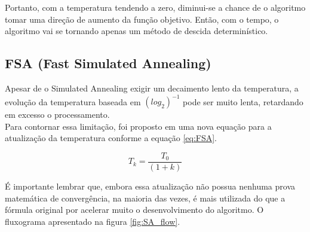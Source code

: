 \documentclass[conference,compsoc]{IEEEtran}
\begin{document}
Portanto, com a temperatura tendendo a zero, diminui-se a chance de o algoritmo tomar uma direção de aumento da função objetivo. Então, com o tempo, o algoritmo vai se tornando apenas um método de descida determinístico.\\


\subsection{FSA (Fast Simulated Annealing)}

Apesar de o Simulated Annealing exigir um decaimento lento da temperatura, a evolução da temperatura baseada em $(log_2)^{-1}$ pode ser muito lenta, retardando em excesso o processamento. \\

Para contornar essa limitação, foi proposto em \cite{FSA} uma nova equação para a atualização da temperatura conforme a equação \ref{eq:FSA}.

\begin{equation}
T_k = \frac{T_0}{(1+k)}
\label{eq:FSA}
\end{equation}

\vspace{0.3cm}

É importante lembrar que, embora essa atualização não possua nenhuma prova matemática de convergência, na maioria das vezes, é mais utilizada do que a fórmula original por acelerar muito o desenvolvimento do algoritmo. O fluxograma apresentado na figura \ref{fig:SA_flow}.
\end{document}
